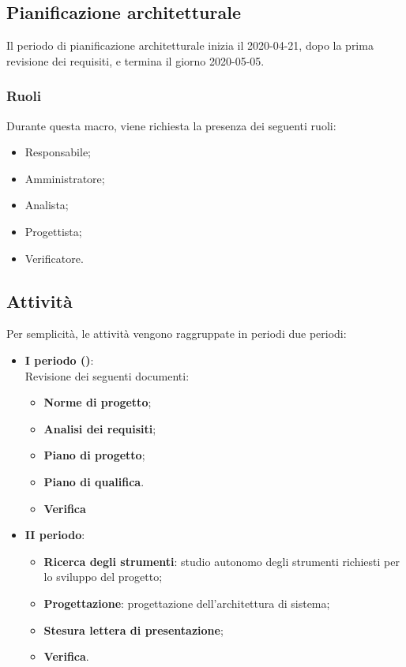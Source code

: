 \documentclass[../piano-di-progetto.tex]{subfiles}
\begin{document}
\subsection{Pianificazione architetturale}
Il periodo di pianificazione architetturale inizia il 2020-04-21, dopo la prima revisione dei requisiti, e termina il giorno 2020-05-05. 

\subsubsection{Ruoli}
Durante questa macro, viene richiesta la presenza dei seguenti ruoli:
\begin{itemize}
    \item Responsabile;
    \item Amministratore;
    \item Analista;
    \item Progettista;
    \item Verificatore.
\end{itemize}

\subsection{Attività}   
Per semplicità, le attività vengono raggruppate in periodi due periodi:
\begin{itemize}

    \item \textbf{I periodo ()}: \\
        Revisione dei seguenti documenti:
        \begin{itemize}
            \item \textbf{Norme di progetto};
            \item \textbf{Analisi dei requisiti};
            \item \textbf{Piano di progetto};
            \item \textbf{Piano di qualifica}.
            \\
            \item \textbf{Verifica}
        \end{itemize}
    \item \textbf{II periodo}:
        \begin{itemize}
            \item \textbf{Ricerca degli strumenti}: studio autonomo degli strumenti richiesti per lo sviluppo del progetto; 
            \item \textbf{Progettazione}: progettazione dell'architettura di sistema;
            \item \textbf{Stesura lettera di presentazione};
            \item \textbf{Verifica}.

        \end{itemize}
        

\end{itemize}
\end{document}
